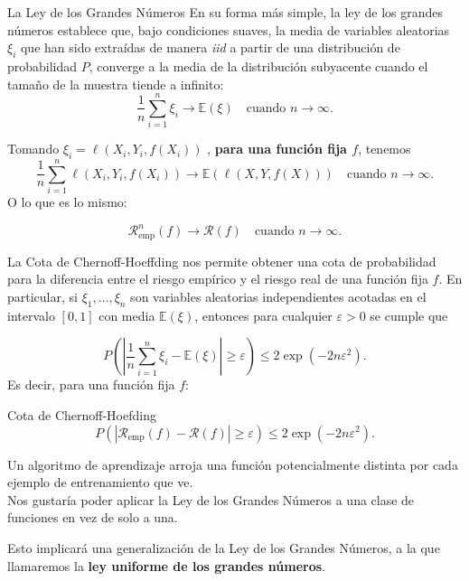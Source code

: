\documentclass[aspectratio=169, 10pt]{beamer}
\begin{document}
\begin{frame}{La Ley de los Grandes Números}
En su forma más simple, la ley de los grandes números
establece que, bajo condiciones suaves, la media de variables aleatorias \(\xi_i\) que han sido extraídas
de manera \textit{iid} a partir de una distribución de probabilidad
\(P\), converge a la media de la distribución subyacente cuando el tamaño de la muestra tiende a infinito:
\pause
  \[
\frac{1}{n} \sum_{i=1}^n \xi_i \to \mathbb{E}(\xi) \quad \text{cuando } n \to \infty.
\]

\pause
Tomando
\(\xi_i = \ell(X_i, Y_i, f(X_i))\)
, \textbf{para una función fija \(f\)},
\pause
tenemos
\[
\frac{1}{n} \sum_{i=1}^n \ell(X_i, Y_i, f(X_i)) \to \mathbb{E}(\ell(X, Y, f(X))) \quad
\text{cuando } n \to \infty.
\]
\pause
O lo que es lo mismo:
\begin{block}{}
\[
\mathcal{R}^n_{\text{emp}}(f)  \to  \mathcal{R}(f) \quad
\text{cuando } n \to \infty.
\]
\end{block}

\end{frame}
\begin{frame}
La Cota de Chernoff-Hoeffding nos permite obtener una cota de probabilidad para la diferencia entre el riesgo empírico y
el riesgo real de una función fija $f$. En particular, si $\xi_1, \ldots, \xi_n$ son variables aleatorias independientes
acotadas en el intervalo $[0,1]$ con media $\mathbb{E}(\xi)$, entonces para cualquier $\varepsilon > 0$ se cumple que

  \begin{equation*}
P\left( \left| \frac{1}{n} \sum_{i=1}^n \xi_i - \mathbb{E}(\xi) \right| \geq \varepsilon \right) \leq
2 \exp(-2n\varepsilon^2).
\end{equation*}
\pause
Es decir, para una función fija $f$:
\begin{block}{Cota de Chernoff-Hoefding}
  \begin{equation*}
P(|\mathcal{R}_{\text{emp}}(f) - \mathcal{R}(f)| \geq \varepsilon) \leq 2 \exp(-2n\varepsilon^2).  \label{eq:Chernoff}
\end{equation*}
\end{block}
\end{frame}
\begin{frame}
  \large
  Un algoritmo de aprendizaje arroja una función potencialmente distinta por cada ejemplo de entrenamiento que ve.\\
\pause
\bigskip
Nos gustaría poder aplicar la Ley de los Grandes Números a una clase de funciones en vez de solo a una.\\
\pause
\bigskip
\begin{alertblock}{ }
  Esto implicará una generalización de la Ley de los Grandes Números,
a la que llamaremos la \textbf{ley uniforme de los grandes números}.
\end{alertblock}
\end{frame}
\end{document}
